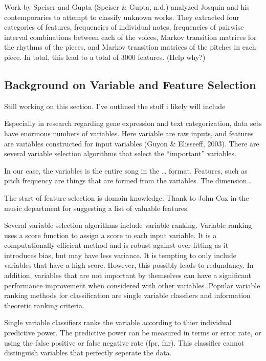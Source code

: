\documentclass[12pt,twoside]{reedthesis}
\theoremstyle{definition}
\theoremstyle{definition}
\theoremstyle{definition}
\theoremstyle{remark}
\begin{document}
Work by Speiser and Gupta (Speiser \& Gupta, n.d.) analyzed Josquin and
his contemporaries to attempt to classify unknown works. They extracted
four categories of features, frequencies of individual notes,
frequencies of pairwise interval combinations between each of the
voices, Markov transition matrices for the rhythms of the pieces, and
Markov transition matrices of the pitches in each piece. In total, this
lead to a total of 3000 features. (Help why?)

\subsection{Background on Variable and Feature
Selection}\label{background-on-variable-and-feature-selection}

Still working on this section. I've outlined the stuff i likely will
include

Especially in research regarding gene expression and text
categorization, data sets have enormous numbers of variables. Here
variable are raw inputs, and features are variables constructed for
input variables (Guyon \& Elisseeff, 2003). There are several variable
selection algorithms that select the ``important'' variables.

In our case, the variables is the entire song in the \ldots{} format.
Features, such as pitch frequency are things that are formed from the
variables. The dimension\ldots{}

The start of feature selection is domain knowledge. Thank to John Cox in
the music department for suggesting a list of valuable features.

Several variable selection algorithms include variable ranking. Variable
ranking uses a score function to assign a score to each input variable.
It is a computationally efficient method and is robust against over
fitting as it introduces bias, but may have less variance. It is
tempting to only include variables that have a high score. However, this
possibly leads to redundancy. In addition, variables that are not
important by themselves can have a significant performance improvement
when considered with other variables. Popular variable ranking methods
for classification are single variable classfiers and information
theoretic ranking criteria.

Single variable classifiers ranks the variable according to thier
individual predictive power. The predictive power can be measured in
terms or error rate, or using the false positive or false negative rate
(fpr, fnr). This classifier cannot distinguish variables that perfectly
seperate the data.
\end{document}

